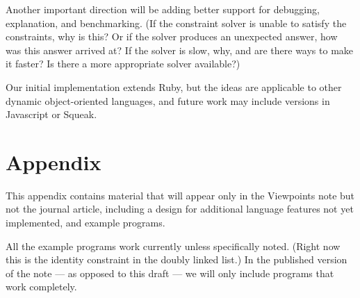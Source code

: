 Another important direction will be adding better support for
debugging, explanation, and benchmarking.  (If the constraint solver
is unable to satisfy the constraints, why is this?  Or if the solver
produces an unexpected answer, how was this answer arrived at?  If the
solver is slow, why, and are there ways to make it faster?  Is there a
more appropriate solver available?)

Our initial implementation extends Ruby, but the ideas are applicable
to other dynamic object-oriented languages, and future work may
include versions in Javascript or Squeak. 




\newpage
\appendix

\section{Appendix}

This appendix contains material that will appear only in the
Viewpoints note but not the journal article, including a design for
additional language features not yet implemented, and example
programs.  

All the example programs work currently unless specifically noted.
(Right now this is the identity constraint in the doubly linked list.)
In the published version of the note --- as opposed to this draft ---
we will only include programs that work completely.

